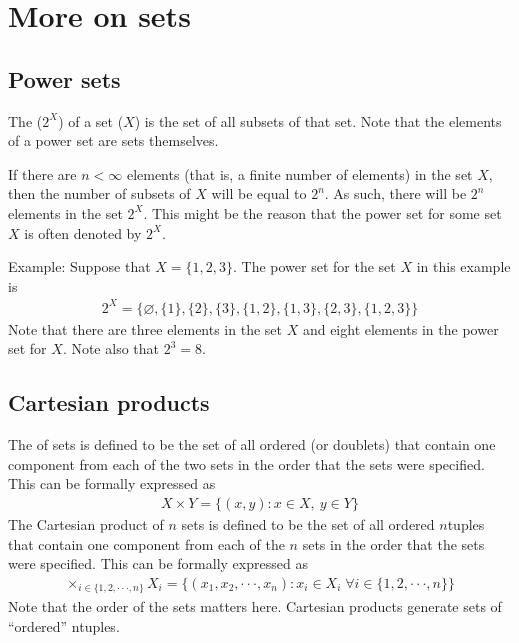 \documentclass[letterpaper,10pt,english]{jupyterBook}
\begin{document}
\section{More on sets}
\label{\detokenize{02.sets_numbers_coordinates_distances:more-on-sets}}

\subsection{Power sets}
\label{\detokenize{02.sets_numbers_coordinates_distances:power-sets}}
\sphinxAtStartPar
The  (\(2^X\)) of a set (\(X\)) is the set of all subsets of that set. Note that the elements of a power set are sets themselves.

\sphinxAtStartPar
If there are \(n < \infty\) elements (that is, a finite number of elements) in the set \(X\), then the number of subsets of \(X\) will be equal to \(2^n\). As such, there will be \(2^n\) elements in the set \(2^X\). This might be the reason that the power set for some set \(X\) is often denoted by \(2^X\).

\sphinxAtStartPar
Example: Suppose that \(X = \{1, 2, 3\}\). The power set for the set \(X\) in this example is
\begin{equation*}
\begin{split}2^X = \{\varnothing, \{1\} , \{2\} , \{3\} , \{1, 2\} , \{1, 3\} , \{2, 3\} , \{1, 2, 3\}\}\end{split}
\end{equation*}
\sphinxAtStartPar
Note that there are three elements in the set \(X\) and eight elements in the power set for \(X\). Note also that \(2^3 = 8\).


\subsection{Cartesian products}
\label{\detokenize{02.sets_numbers_coordinates_distances:cartesian-products}}
\sphinxAtStartPar
The  of  sets is defined to be the set of all ordered  (or doublets) that contain one component from each of the two sets in the order that the sets were specified. This can be formally expressed as
\begin{equation*}
\begin{split}X \times Y = \{(x, y) : x \in X , \: y \in Y \}\end{split}
\end{equation*}
\sphinxAtStartPar
The Cartesian product of \(n\) sets is defined to be the set of all ordered \(n\)\sphinxhyphen{}tuples that contain one component from each of the \(n\) sets in the order that the sets were specified. This can be formally expressed as
\begin{equation*}
\begin{split}\times_{i \in \{1,2,··· ,n\}} X_i = \{(x_1, x_2, · · · , x_n) : x_i \in X_i \; \forall i \in \{1, 2, · · · , n\}\}\end{split}
\end{equation*}
\sphinxAtStartPar
Note that the order of the sets matters here. Cartesian products generate sets of “ordered” n\sphinxhyphen{}tuples.
\end{document}
